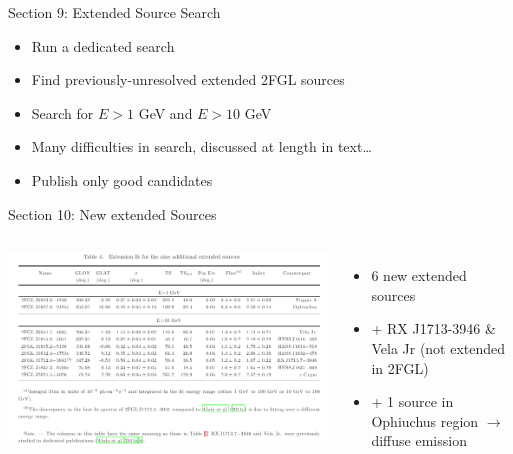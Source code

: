 \documentclass[12pt]{beamer}
\begin{document}
\begin{frame}{Section 9: Extended Source Search}
  \begin{itemize}
    \item Run a dedicated search 
    \item Find previously-unresolved
      extended 2FGL sources
    \item Search for $E>1$ GeV and $E>10$ GeV
    \item Many difficulties in search, discussed at length in text\dots
    \item Publish only good candidates
  \end{itemize}
\end{frame}

\begin{frame}{Section 10: New extended Sources}
  \begin{columns}
    \includegraphics[scale=0.30]{plots/new_extended.png}
    \begin{itemize}
      \item 6 new extended sources
      \item + RX J1713-3946 \& Vela Jr (not extended in 2FGL)
      \item + 1 source in Ophiuchus region $\rightarrow$ diffuse emission
    \end{itemize}
  \end{columns}
\end{frame}
\end{document}

